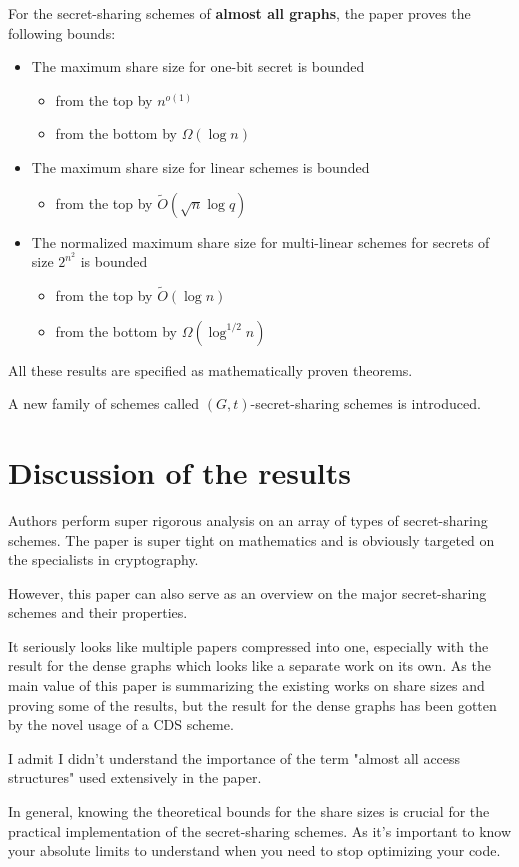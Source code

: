For the secret-sharing schemes of \textbf{almost all graphs}, the paper proves the following bounds:

\begin{itemize}
    \item The maximum share size for one-bit secret is bounded 
    \begin{itemize}
        \item from the top by $n^{o(1)}$
        \item from the bottom by $\Omega(\log n)$
    \end{itemize}
    \item The maximum share size for linear schemes is bounded
    \begin{itemize}
        \item from the top by $\tilde{O}(\sqrt{n} \log q)$
    \end{itemize}
    \item The normalized maximum share size for multi-linear schemes for secrets of size $2^{n^2}$ is bounded
    \begin{itemize}
        \item from the top by $\tilde{O}(\log n)$
        \item from the bottom by $\Omega(\log^{1/2} n)$
    \end{itemize}
\end{itemize}

All these results are specified as mathematically proven theorems.

A new family of schemes called $(G, t)$-secret-sharing schemes is introduced.

\section{Discussion of the results}

Authors perform super rigorous analysis on an array of types of secret-sharing schemes.
The paper is super tight on mathematics and is obviously targeted on the specialists in cryptography.

However, this paper can also serve as an overview on the major secret-sharing schemes and their properties.

It seriously looks like multiple papers compressed into one, especially with the result for the dense graphs which looks like a separate work on its own.
As the main value of this paper is summarizing the existing works on share sizes and proving some of the results,
but the result for the dense graphs has been gotten by the novel usage of a CDS scheme.

I admit I didn't understand the importance of the term "almost all access structures" used extensively in the paper.

In general, knowing the theoretical bounds for the share sizes is crucial for the practical implementation of the secret-sharing schemes.
As it's important to know your absolute limits to understand when you need to stop optimizing your code.

